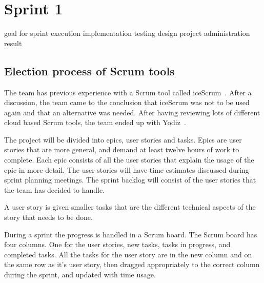 \section{Sprint 1}
goal for sprint
execution
implementation
testing
design
project administration
result

\subsection{Election process of Scrum tools}
\label{sec:scrumtools}
The team has previous experience with a Scrum tool called iceScrum~\cite{icescrum}. After a discussion, the team came to the conclusion 
that iceScrum was not to be used again and that an alternative was needed.
After having reviewing lots of different cloud based Scrum tools, the team ended up with Yodiz~\cite{yodiz}.

The project will be divided into epics, user stories and tasks. Epics are user stories that are more general, 
and demand at least twelve hours of work to complete. Each epic consists
of all the user stories that explain the usage of the epic in more detail.
The user stories will have time estimates discussed during sprint planning meetings.
The sprint backlog will consist of the user stories that the team has decided to handle.

A user story is given smaller tasks that are the different technical aspects of the story that needs to be done.

During a sprint the progress is handled in a Scrum board. The Scrum board has four columns. One for the user stories, new tasks, tasks in progress, and completed tasks.
All the tasks for the user story are in the new column and on the same row as it's user story, then dragged appropriately to the correct column during the sprint, and updated with time usage.
